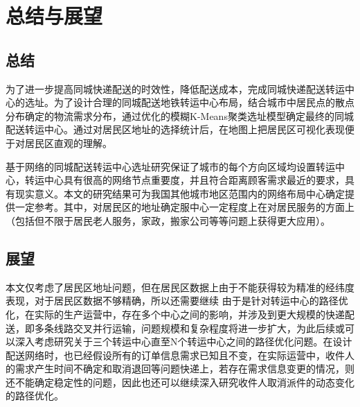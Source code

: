 \clearpage
\setcounter{equation}{0}
\section{总结与展望}
\subsection{总结}
\par 为了进一步提高同城快递配送的时效性，降低配送成本，完成同城快递配送转运中心的选址。为了设计合理的同城配送地铁转运中心布局，结合城市中居民点的散点分布确定的物流需求分布，通过优化的模糊\rm{K-Means}聚类选址模型确定最终的同城配送转运中心。通过对居民区地址的选择统计后，在地图上把居民区可视化表现便于对居民区直观的理解。
\par 基于网络的同城配送转运中心选址研究保证了城市的每个方向区域均设置转运中心，转运中心具有很高的网络节点重要度，并且符合距离顾客需求最近的要求，具有现实意义。本文的研究结果可为我国其他城市地区范围内的网络布局中心确定提供一定参考。其中，对居民区的地址确定服中心一定程度上在对居民服务的方面上（包括但不限于居民老人服务，家政，搬家公司等等问题上获得更大应用）。

\subsection{展望}
\par 本文仅考虑了居民区地址问题，但在居民区数据上由于不能获得较为精准的经纬度表现，对于居民区数据不够精确，所以还需要继续
由于是针对转运中心的路径优化，在实际的生产运营中，存在多个中心之间的影响，并涉及到更大规模的快递配送，即多条线路交叉并行运输，问题规模和复杂程度将进一步扩大，为此后续或可以深入考虑研究关于三个转运中心直至N个转运中心之间的路径优化问题。在设计配送网络时，也已经假设所有的订单信息需求已知且不变，在实际运营中，收件人的需求产生时间不确定和取消退回等问题快递上，若存在需求信息变更的情况，则还不能确定稳定性的问题，因此也还可以继续深入研究收件人取消派件的动态变化的路径优化。 


% 

% 

% 
